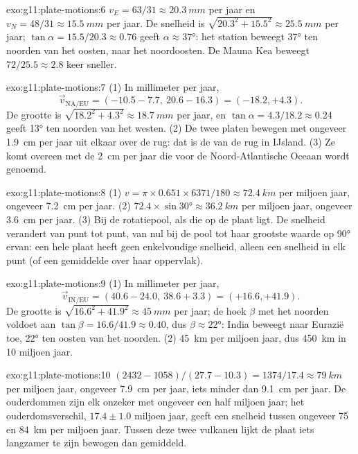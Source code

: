 \begin{solution}{exo:g11:plate-motions:6}
$v_E = 63/31 \approx \qty{20.3}{mm}$ per jaar en $v_N = 48/31 \approx
\qty{15.5}{mm}$ per jaar. De snelheid is $\sqrt{20.3^2 + 15.5^2} \approx
\qty{25.5}{mm}$ per jaar; $\tan\alpha = 15.5/20.3 \approx 0.76$ geeft $\alpha
\approx \ang{37}$: het station beweegt \ang{37} ten noorden van het oosten, naar het
noordoosten. De Mauna Kea beweegt $72/25.5 \approx 2.8$ keer sneller.
\end{solution}

\begin{solution}{exo:g11:plate-motions:7}
(1) In millimeter per jaar,
\[
  \vec v_{\mathrm{NA/EU}} = (-10.5 - 7.7,\ 20.6 - 16.3) = (-18.2, +4.3).
\] De grootte is $\sqrt{18.2^2 + 4.3^2} \approx
\qty{18.7}{mm}$ per jaar, en $\tan\alpha = 4.3/18.2 \approx 0.24$ geeft
\ang{13} ten noorden van het westen. (2) De twee platen bewegen met ongeveer
\qty{1.9}{cm} per jaar uit elkaar over de rug: dat is de  van de rug in IJsland. (3) Ze komt overeen met de \qty{2}{cm}
per jaar die voor de Noord-Atlantische Oceaan wordt genoemd.
\end{solution}

\begin{solution}{exo:g11:plate-motions:8}
(1) $v = \pi \times 0.651 \times 6371/180 \approx \qty{72.4}{km}$ per miljoen
jaar, ongeveer \qty{7.2}{cm} per jaar. (2) $72.4 \times \sin\ang{30} \approx
\qty{36.2}{km}$ per miljoen jaar, ongeveer \qty{3.6}{cm} per jaar. (3) Bij de
rotatiepool, als die op de plaat ligt. De snelheid verandert van punt tot
punt, van nul bij de pool tot haar grootste waarde op \ang{90} ervan: een
hele plaat heeft geen enkelvoudige snelheid, alleen een snelheid in elk punt (of
een gemiddelde over haar oppervlak).
\end{solution}

\begin{solution}{exo:g11:plate-motions:9}
(1) In millimeter per jaar,
\[
  \vec v_{\mathrm{IN/EU}} = (40.6 - 24.0,\ 38.6 + 3.3) = (+16.6, +41.9).
\] De grootte is $\sqrt{16.6^2 + 41.9^2} \approx
\qty{45}{mm}$ per jaar; de hoek $\beta$ met het noorden voldoet aan $\tan\beta =
16.6/41.9 \approx 0.40$, dus $\beta \approx \ang{22}$: India beweegt naar
Eurazië toe, \ang{22} ten oosten van het noorden. (2) \qty{45}{km} per miljoen
jaar, dus \qty{450}{km} in 10 miljoen jaar.
\end{solution}

\begin{solution}{exo:g11:plate-motions:10}
$(2432 - 1058)/(27.7 - 10.3) = 1374/17.4 \approx \qty{79}{km}$ per miljoen
jaar, ongeveer \qty{7.9}{cm} per jaar, iets minder dan \qty{9.1}{cm} per jaar.
De ouderdommen zijn elk onzeker met ongeveer een half miljoen jaar; het
ouderdomsverschil, $17.4 \pm 1.0$ miljoen jaar, geeft een snelheid tussen ongeveer 75 en
\qty{84}{km} per miljoen jaar. Tussen deze twee vulkanen lijkt de plaat iets
langzamer te zijn bewogen dan gemiddeld.
\end{solution}

